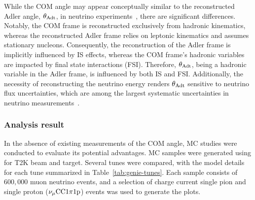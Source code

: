           While the COM angle may appear conceptually similar to the reconstructed Adler angle, $\theta_{\textrm{Adt}}$, in neutrino experiments~\cite{Sanchez:2015yvw}, there are significant differences. 
          Notably, the COM frame is reconstructed exclusively from hadronic kinematics, whereas the reconstructed Adler frame relies on leptonic kinematics and assumes stationary nucleons. 
          Consequently, the reconstruction of the Adler frame is implicitly influenced by IS effects, whereas the COM frame's hadronic variables are impacted by final state interactions (FSI). 
          Therefore, $\theta_{\textrm{Adt}}$, being a hadronic variable in the Adler frame, is influenced by both IS and FSI. 
          Additionally, the necessity of reconstructing the neutrino energy renders $\theta_{\textrm{Adt}}$ sensitive to neutrino flux uncertainties, which are among the largest systematic uncertainties in neutrino measurements~\cite{T2K:2019yqu,T2K:2021naz,MicroBooNECollaboration:2024gvg,NOvA:2023uxq,MINERvA:2022djk}.


          \subsubsection{Analysis result}
          \label{sec:com-ana}
          In the absence of existing measurements of the COM angle, MC studies were conducted to evaluate its potential advantages.
          MC samples were generated using \genie \cite{Andreopoulos:2009rq, GENIE:2021npt} for T2K beam and target. 
          Several \genie tunes were compared, with the model details for each tune summarized in Table~\ref{tab:genie-tunes}. 
          Each sample consists of $600,000$ muon neutrino events, and a selection of charge current single pion and single proton ($\nu_{\mu}\textrm{CC}1\pi1\textrm{p}$) events was used to generate the plots.

